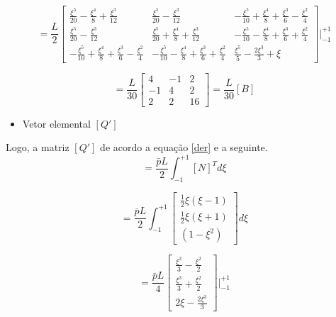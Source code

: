 \documentclass{article} %
\begin{document}
\begin{equation*}
[k^*]=\frac{L}{2}\begin{bmatrix}
\frac{\xi^5}{20}-\frac{\xi^4}{8}+\frac{\xi^3}{12}&\frac{\xi^5}{20}-\frac{\xi^3}{12}&-\frac{\xi^5}{10}+\frac{\xi^4}{8}+\frac{\xi^3}{6}-\frac{\xi^2}{4}\\
\frac{\xi^5}{20}-\frac{\xi^3}{12}&\frac{\xi^5}{20}+\frac{\xi^4}{8}+\frac{\xi^3}{12}&-\frac{\xi^5}{10}-\frac{\xi^4}{8}+\frac{\xi^3}{6}+\frac{\xi^2}{4}\\
-\frac{\xi^5}{10}+\frac{\xi^4}{8}+\frac{\xi^3}{6}-\frac{\xi^2}{4}&-\frac{\xi^5}{10}-\frac{\xi^4}{8}+\frac{\xi^3}{6}+\frac{\xi^2}{4}&\frac{\xi^5}{5}-\frac{2\xi^3}{3}+\xi
\end{bmatrix}\biggr|_{-1}^{+1}
\end{equation*}


\begin{equation}
[k^*]=\frac{L}{30}\begin{bmatrix}
4&-1&2\\
-1&4&2\\
2&2&16
\end{bmatrix}=\frac{L}{30}[B]
\end{equation}

\begin{itemize}
	\item Vetor elemental \([Q']\)	
\end{itemize}


Logo, a matriz \([Q']\) de acordo a equação \ref{der} e a seguinte.
\begin{equation*}
[{Q}']=\frac{\bar{p}L}{2}\int_{-1}^{+1}[N]^Td\xi
\end{equation*}

\begin{equation*}
[{Q}']=\frac{\bar{p}L}{2}\int_{-1}^{+1}\begin{bmatrix}
\frac{1}{2}\xi(\xi-1)\\\frac{1}{2}\xi(\xi+1)\\(1-\xi^2)
\end{bmatrix}d\xi
\end{equation*}

\begin{equation*}
[{Q}']=\frac{\bar{p}L}{4}\begin{bmatrix}
\frac{\xi^3}{3}-\frac{\xi^2}{2}\\\frac{\xi^3}{3}+\frac{\xi^2}{2}\\2\xi-\frac{2\xi^3}{3}
\end{bmatrix}\biggr|_{-1}^{+1}
\end{equation*}
\end{document}
